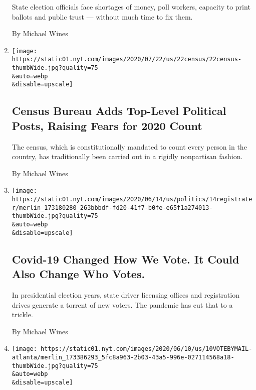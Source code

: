 \begin{enumerate}
  State election officials face shortages of money, poll workers,
  capacity to print ballots and public trust --- without much time to
  fix them.

  By Michael Wines
\item
  \href{/2020/06/23/us/census-bureau-cogley-korzeniewski.html}{}

  \texttt{[image: https://static01.nyt.com/images/2020/07/22/us/22census/22census-thumbWide.jpg?quality=75\\\&auto=webp\\\&disable=upscale]}

  \hypertarget{census-bureau-adds-top-level-political-posts-raising-fears-for-2020-count}{%
  \subsection{Census Bureau Adds Top-Level Political Posts, Raising
  Fears for 2020
  Count}\label{census-bureau-adds-top-level-political-posts-raising-fears-for-2020-count}}

  The census, which is constitutionally mandated to count every person
  in the country, has traditionally been carried out in a rigidly
  nonpartisan fashion.

  By Michael Wines
\item
  \href{/2020/06/14/us/voter-registration-coronavirus-2020-election.html}{}

  \texttt{[image: https://static01.nyt.com/images/2020/06/14/us/politics/14registrater/merlin\_173180280\_263bbbdf-fd20-41f7-b0fe-e65f1a274013-thumbWide.jpg?quality=75\\\&auto=webp\\\&disable=upscale]}

  \hypertarget{covid-19-changed-how-we-vote-it-could-also-change-who-votes}{%
  \subsection{Covid-19 Changed How We Vote. It Could Also Change Who
  Votes.}\label{covid-19-changed-how-we-vote-it-could-also-change-who-votes}}

  In presidential election years, state driver licensing offices and
  registration drives generate a torrent of new voters. The pandemic has
  cut that to a trickle.

  By Michael Wines
\item
  \href{/2020/06/10/us/politics/voting-by-mail-georgia.html}{}

  \texttt{[image: https://static01.nyt.com/images/2020/06/10/us/10VOTEBYMAIL-atlanta/merlin\_173386293\_5fc8a963-2b03-43a5-996e-027114568a18-thumbWide.jpg?quality=75\\\&auto=webp\\\&disable=upscale]}


\end{enumerate}
